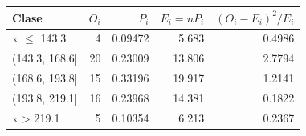 \begin{tabular}{lrrrr}
\toprule
\textbf{Clase} & \textbf{$O_i$} & \textbf{$P_i$} & \textbf{$E_i=nP_i$} & \textbf{$(O_i-E_i)^2/E_i$} \\ \midrule
x $\le$ 143.3 & 4 & 0.09472 & 5.683 & 0.4986 \\
(143.3, 168.6] & 20 & 0.23009 & 13.806 & 2.7794 \\
(168.6, 193.8] & 15 & 0.33196 & 19.917 & 1.2141 \\
(193.8, 219.1] & 16 & 0.23968 & 14.381 & 0.1822 \\
x > 219.1 & 5 & 0.10354 & 6.213 & 0.2367 \\
\bottomrule
\end{tabular}